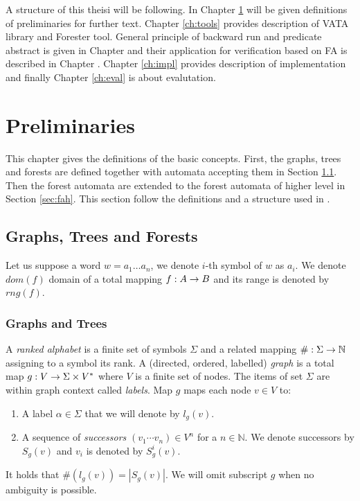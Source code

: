 A structure of this theisi will be following.
In Chapter \ref{ch:prel} will be given definitions of preliminaries for further text.
Chapter \ref{ch:tools} provides description of VATA library and Forester tool.
General principle of backward run and predicate abstract is given in Chapter \label{ch:pred} and their
application for verification based on FA is described in Chapter \label{ch:backwar}.
Chapter \ref{ch:impl} provides description of implementation and finally Chapter \ref{ch:eval} is about evalutation.
\cite{Knuth}

\chapter{Preliminaries}
\label{ch:prel}

This chapter gives the definitions of the basic concepts.
First, the graphs, trees and forests are defined together with automata accepting them in Section \ref{sec:graph}.
Then the forest automata are extended to the forest automata of higher level in Section \ref{sec:fah}.
This section follow the definitions and a structure used in \cite{cav13:techrep}.

\section{Graphs, Trees and Forests}
\label{sec:graph}

Let us suppose a word $w = a_1 \ldots a_n$, we denote $i$-th symbol of $w$ as $a_i$.
We denote $dom(f)$ domain of a total mapping $f: A \rightarrow B$ and its range is denoted by $rng(f)$.

\subsection{Graphs and Trees}
\label{subsec:graph}
A \emph{ranked alphabet} is a finite set of symbols $\Sigma$ and a related mapping $\#: \Sigma \rightarrow \mathbb{N}$
assigning to a symbol its rank.
A (directed, ordered, labelled) \emph{graph} is a total map $g: V \rightarrow \Sigma \times V^{*}$ where $V$ is a finite set of nodes.
The items of set $\Sigma$ are within graph context called \emph{labels}.
Map $g$ maps each node $v\in V$ to:
\begin{enumerate}
	\item A label $\alpha \in \Sigma$ that we will denote by $l_g(v)$.
	\item A sequence of \emph{successors} $(v_1 \cdots v_n) \in V^n$ for a $n \in \mathbb{N}$.
		We denote successors by $S_g(v)$ and $v_i$ is denoted by $S^i_g(v)$.
\end{enumerate}
It holds that $\#(l_g(v)) = |S_g(v)|$.
We will omit subscript $g$ when no ambiguity is possible.

